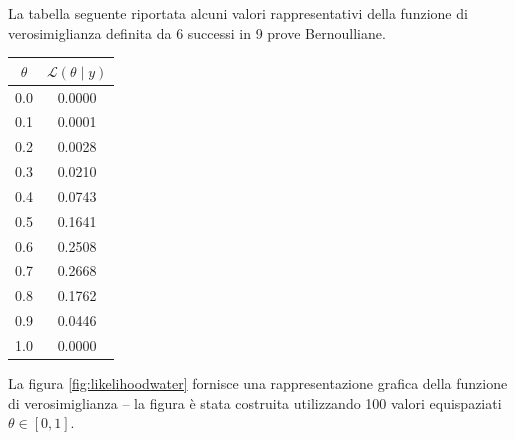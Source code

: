 \documentclass[
]{memoir}
\theoremstyle{definition}
\theoremstyle{definition}
\theoremstyle{definition}
\theoremstyle{definition}
\theoremstyle{remark}
\begin{document}
La tabella seguente riportata alcuni valori rappresentativi della funzione di verosimiglianza definita da 6 successi in 9 prove Bernoulliane.

\hypertarget{tab:likebino}{}
\begin{longtable}[]{@{}cc@{}}
\toprule
\(\theta\) & \(\mathcal{L}(\theta \mid y)\) \\
\midrule
\endhead
0.0 & 0.0000 \\
0.1 & 0.0001 \\
0.2 & 0.0028 \\
0.3 & 0.0210 \\
0.4 & 0.0743 \\
0.5 & 0.1641 \\
0.6 & 0.2508 \\
0.7 & 0.2668 \\
0.8 & 0.1762 \\
0.9 & 0.0446 \\
1.0 & 0.0000 \\
\bottomrule
\end{longtable}

La figura \ref{fig:likelihoodwater} fornisce una rappresentazione grafica della funzione di verosimiglianza -- la figura è stata costruita utilizzando 100 valori equispaziati \(\theta \in [0, 1]\).
\end{document}
